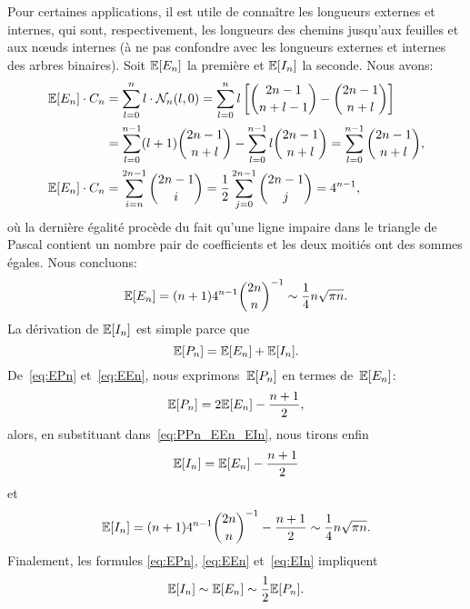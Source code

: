 Pour certaines applications, il est utile de connaître les longueurs
externes et internes, qui sont, respectivement, les longueurs des
chemins jusqu'aux feuilles et aux nœuds internes (à ne pas
confondre avec les longueurs externes et internes des arbres
binaires). Soit \(\mathbb{E}[{E_n}]\) la première et \(\mathbb{E}[{I_n}]\)
la seconde. Nous avons:
\begin{align*}
\mathbb{E}[{E_n}] \cdot C_n
  &= \sum_{l=0}^{n} l \cdot \mathcal{N}_n(l,0)
   = \sum_{l=0}^{n}l\left[\binom{2n-1}{n+l-1} -
     \binom{2n-1}{n+l}\right]\\
  &= \sum_{l=0}^{n-1}(l+1)\binom{2n-1}{n+l} -
     \sum_{l=0}^{n-1}l \binom{2n-1}{n+l}
   = \sum_{l=0}^{n-1}\binom{2n-1}{n+l},\\
\mathbb{E}[{E_n}] \cdot C_n
  &= \sum_{i=n}^{2n-1}\binom{2n-1}{i}
   = \frac{1}{2}\sum_{j=0}^{2n-1}\binom{2n-1}{j} = 4^{n-1},
\end{align*}
où la dernière égalité procède du fait qu'une ligne impaire dans le
triangle de Pascal contient un nombre pair de coefficients et les deux
moitiés ont des sommes égales. Nous concluons:
\begin{equation}
\mathbb{E}[{E_n}] = (n+1) 4^{n-1}\binom{2n}{n}^{-1} \sim
\frac{1}{4}n\sqrt{\pi n}.
\label{eq:EEn}
\end{equation}
La dérivation de \(\mathbb{E}[{I_n}]\) est simple parce que
\begin{equation}
\mathbb{E}[{P_n}] = \mathbb{E}[{E_n}] + \mathbb{E}[{I_n}].
\label{eq:PPn_EEn_EIn}
\end{equation}
De~\eqref{eq:EPn} et~\eqref{eq:EEn}, nous exprimons~\(\mathbb{E}[{P_n}]\)
en termes de~\(\mathbb{E}[{E_n}]\):
\begin{equation*}
\mathbb{E}[{P_n}] = 2 \mathbb{E}[{E_n}] - \frac{n+1}{2},
\end{equation*}
alors, en substituant dans~\eqref{eq:PPn_EEn_EIn}, nous tirons enfin
\begin{equation*}
\mathbb{E}[{I_n}] = \mathbb{E}[{E_n}] - \frac{n+1}{2}
\end{equation*}
et
\begin{equation}
\mathbb{E}[{I_n}]
  = (n+1)4^{n-1}\binom{2n}{n}^{-1} - \frac{n+1}{2} \sim
  \frac{1}{4}n\sqrt{\pi n}.
\label{eq:EIn}
\end{equation}
Finalement, les formules \eqref{eq:EPn}, \eqref{eq:EEn}
et~\eqref{eq:EIn} impliquent
\begin{equation*}
\mathbb{E}[{I_n}] \sim \mathbb{E}[{E_n}] \sim \frac{1}{2}\mathbb{E}[{P_n}].
\end{equation*}

